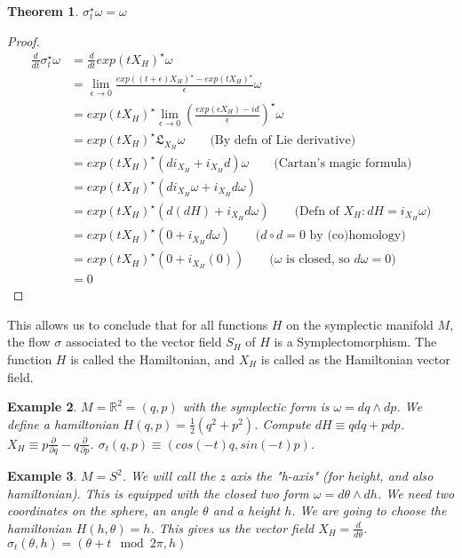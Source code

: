 \documentclass[11pt]{book}
\newcommand{\Lie}{\ensuremath{\mathfrak{L}}}
\newtheorem{theorem}{Theorem}
\newtheorem{proof}[theorem]{Proof}
\newtheorem{example}[theorem]{Example}
\begin{document}
\begin{theorem}
    $\sigma_t^\star \omega = \omega$
\end{theorem}
\begin{proof}
    \begin{align*}
        \frac{d}{dt} \sigma_t^\star \omega 
        &= \frac{d}{dt} exp(tX_H)^\star \omega \\
        &= \lim_{\epsilon \rightarrow 0} \frac{exp((t + \epsilon)X_H)^\star  - exp(tX_H)^\star}{\epsilon} \omega \\
        &= exp(tX_H)^\star \lim_{\epsilon \rightarrow 0} \left (\frac{exp(\epsilon X_H)  - id}{\epsilon}\right)^\star \omega\\
        &= exp(tX_H)^\star \Lie_{X_H} \omega \qquad \text{(By defn of Lie derivative)} \\
        &= exp(tX_H)^\star (d i_{X_H} + i_{X_H} d) \omega \qquad \text{(Cartan's magic formula)} \\
        &= exp(tX_H)^\star (d i_{X_H} \omega  + i_{X_H} d \omega) \\
        &= exp(tX_H)^\star (d (dH) + i_{X_H} d \omega) \qquad \text{(Defn of $X_H: dH = i_{X_H} \omega$)}\\
        &= exp(tX_H)^\star (0 + i_{X_H} d \omega) \qquad \text{($d \circ d = 0$ by (co)homology)}\\
        &= exp(tX_H)^\star (0 + i_{X_H} (0)) \qquad \text{($\omega$ is closed, so $d \omega = 0$)}\\
        &= 0
    \end{align*}
\end{proof}

This allows us to conclude that for all functions $H$ on the symplectic
manifold $M$, the flow $\sigma$ associated to the vector field $S_H$ of $H$ is
a Symplectomorphism.  The function $H$ is called the Hamiltonian, and $X_H$ is
called as the Hamiltonian vector field.

\begin{example}
    $M = \mathbb R^2 = (q, p)$ with the symplectic form is $\omega = dq \wedge dp$.
    We define a hamiltonian $H(q, p) = \frac{1}{2}(q^2 + p^2)$. Compute $dH \equiv q dq + pdp$. 
    $X_H \equiv p \frac{\partial}{\partial q} - q \frac{\partial}{\partial p}$.
    $\sigma_t(q, p) \equiv \left( cos(-t) q, sin(-t)p \right)$.
\end{example}

\begin{example}
    $M = S^2$. We will call the $z$ axis the "h-axis" (for height, and also hamiltonian).
    This is equipped with the closed two form $\omega = d\theta \wedge dh$.
    We need two coordinates on the sphere, an angle $\theta$ and a height $h$.
    We are going to choose the hamiltonian $H(h, \theta) = h$.
    This gives us the vector field $X_H = \frac{d}{d \theta}$.
    $\sigma_t(\theta, h) = (\theta + t \mod 2 \pi, h)$
\end{example}
\end{document}

